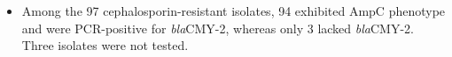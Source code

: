 \documentclass[portrait,a0paper,fontscale=0.31]{baposter}
\newcommand{\cmy}{\textit{bla}{\tiny CMY-2}}
\begin{document}
\begin{poster}
{\begin{multicols}{2}
\begin{itemize}
      \item Among the 97 cephalosporin-resistant isolates, 94 exhibited AmpC phenotype and were PCR-positive for \cmy, whereas only 3 lacked \cmy. Three isolates were not tested.
      \end{itemize}
    \end{multicols}

  \captionsetup{labelformat=empty,margin=0.6cm}
  }



\end{poster}
\end{document}

